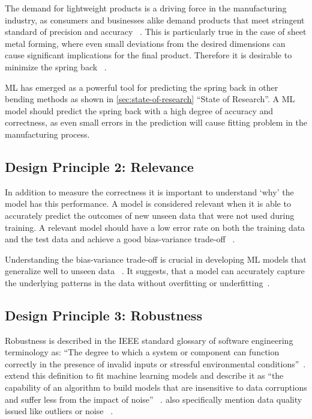 The demand for lightweight products is a driving force in the manufacturing industry,
as consumers and businesses alike demand products that meet stringent standard of
precision and accuracy
~\cite[p. 2]{cruz_applicationmachinelearning_2021}.
This is particularly true in the case of sheet metal forming, where even small
deviations from the desired dimensions can cause significant implications for the final
product.
Therefore it is desirable to minimize the spring back
~\cite[p.1]{cruz_applicationmachinelearning_2021}.

\ac{ML} has emerged as a powerful tool for predicting the spring back in other bending
methods as shown in \cref{sec:state-of-research} ``State of Research''.
A \ac{ML} model should predict the spring back with a high degree of accuracy and
correctness, as even small errors in the prediction will cause fitting problem in the
manufacturing process.

\subsection*{Design Principle 2: Relevance}
In addition to measure the correctness it is important to understand `why'
the model has this performance.
A model is considered relevant when it is able to accurately predict the outcomes of
new unseen data that were not used during training.
A relevant model should have a low error rate on both the training data and the test
data and achieve a good bias-variance trade-off
~\cite[p. 16]{siebert2022construction}.

Understanding the bias-variance trade-off is crucial in developing \ac{ML} models that
generalize well to unseen data
~\cite[p. 49--51]{zhou_machinelearning_2021}.
It suggests, that a model can accurately capture the underlying patterns in the data
without overfitting or underfitting~\cite[p. 49--51]{zhou_machinelearning_2021}.

\subsection*{Design Principle 3: Robustness}
Robustness is described in the IEEE standard glossary of software engineering terminology as:
``The degree to which a system or component can function correctly in the presence of
invalid inputs or stressful environmental conditions''~\cite[p. 64]{terminology1990ieee}.
\cite{saez2016evaluating} extend this definition to fit machine learning
models and describe it as ``the capability of an algorithm to build models that are insensitive to
data corruptions and suffer less from the impact of noise''
~\cite[p. 2]{saez_evaluatingclassifierbehavior_2016}.
\cite{siebert2022construction} also specifically mention data quality issued like
outliers or noise
~\cite[p. 16]{siebert2022construction}.

